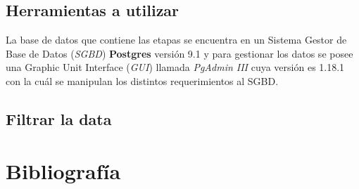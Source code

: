 \documentclass[12pt]{article}
\begin{document}
	\subsection{Herramientas a utilizar}
	
	La base de datos que contiene las etapas se encuentra en un Sistema Gestor de Base de Datos (\textit{SGBD}) \textbf{Postgres} versión 9.1 y para gestionar los datos se posee una Graphic Unit Interface (\textit{GUI}) llamada \textit{PgAdmin III} cuya versión es 1.18.1 con la cuál se manipulan los distintos requerimientos al SGBD. 
	
	
	\subsection{Filtrar la data}
	
	
		
    
    

    
    
    \newpage
    \section{Bibliografía}

    \renewcommand{\section}[2]{} %

    
    
    \nocite{libro_visualizacion} %

    
\end{document}
